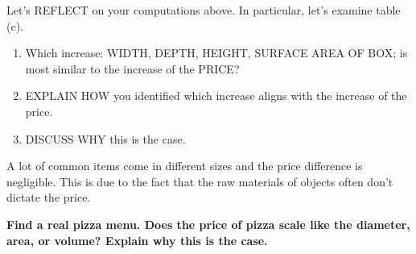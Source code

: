 \documentclass[nooutcomes,noauthor,handout,12pt]{ximera}
\begin{document}




\begin{question}
  Let's REFLECT on your computations above. In particular, let's
  examine table (c).%
  \begin{enumerate}
    \item Which increase: WIDTH, DEPTH, HEIGHT, SURFACE AREA OF BOX;
      is most similar to the increase of the PRICE?
    \item EXPLAIN HOW you identified which increase aligns with the
      increase of the price.
    \item DISCUSS WHY this is the case.
  \end{enumerate}
\end{question}
\mynewpage


\begin{question}
  A lot of common items come in different sizes and the price
  difference is negligible. This is due to the fact that the raw
  materials of objects often don't dictate the price.

  \textbf{Find a real pizza menu. Does the price of pizza scale like the
  diameter, area, or volume?  Explain why this is the case.}
 
\end{question}
\end{document}
